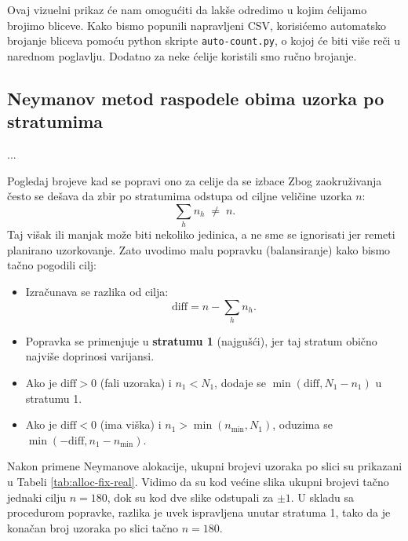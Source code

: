 \documentclass[a4paper,12pt]{article}
\begin{document}
\noindent
Ovaj vizuelni prikaz će nam omogućiti da lakše odredimo u kojim ćelijamo brojimo bliceve. 
Kako bismo popunili napravljeni CSV, korisićemo automatsko brojanje bliceva pomoću python skripte \texttt{auto-count.py}, o kojoj će biti više
reči u narednom poglavlju. Dodatno za neke ćelije koristili smo ručno brojanje.

\subsection{Neymanov metod raspodele obima uzorka po stratumima}

... 

Pogledaj brojeve kad se popravi ono za celije da se izbace
\newline
\newline
\noindent
Zbog zaokruživanja često se dešava da zbir po stratumima odstupa od ciljne veličine uzorka $n$:
\[
\sum_h n_h \;\neq\; n.
\]
Taj višak ili manjak može biti nekoliko jedinica, a ne sme se ignorisati jer remeti planirano uzorkovanje.
Zato uvodimo malu popravku (balansiranje) kako bismo tačno pogodili cilj:
\begin{itemize}
  \item Izračunava se razlika od cilja:
  \[
  \text{diff} = n - \sum_h n_h.
  \]
  \item Popravka se primenjuje u \textbf{stratumu 1} (najgušći), jer taj stratum obično najviše doprinosi varijansi. 
  \item Ako je $\text{diff} > 0$ (fali uzoraka) i $n_1 < N_1$, dodaje se $\min(\text{diff}, N_1 - n_1)$ u stratumu 1.
  \item Ako je $\text{diff} < 0$ (ima viška) i $n_1 > \min(n_{\min}, N_1)$, oduzima se $\min(-\text{diff}, n_1 - n_{\min})$.
\end{itemize}

\noindent
Nakon primene Neymanove alokacije, ukupni brojevi uzoraka po slici su prikazani u Tabeli \ref{tab:alloc-fix-real}.  
Vidimo da su kod većine slika ukupni brojevi tačno jednaki cilju $n=180$, dok su kod dve slike odstupali za $\pm 1$.  
U skladu sa procedurom popravke, razlika je uvek ispravljena unutar stratuma 1, tako da je konačan broj uzoraka po slici tačno $n=180$.
\end{document}
